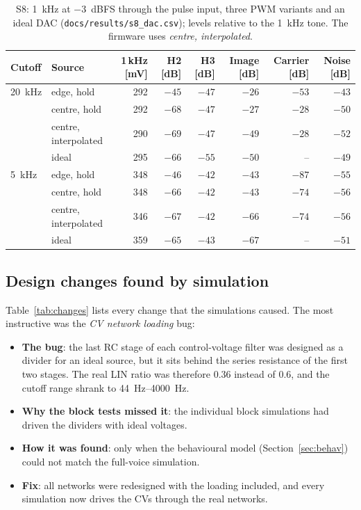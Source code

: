 \documentclass[11pt,a4paper]{article}
\newcommand{\file}[1]{\texttt{#1}}
\begin{document}
\begin{table}[h]
\centering\small
\caption{S8: \SI{1}{kHz} at \SI{-3}{dBFS} through the pulse input, three PWM variants and an ideal DAC
(\file{docs/results/s8\_dac.csv}); levels relative to the \SI{1}{kHz} tone. The firmware uses
\emph{centre, interpolated}.}\label{tab:s8}
\setlength{\tabcolsep}{4.5pt}
\begin{tabular}{@{}l l r r r r r r@{}}
\toprule
Cutoff & Source & 1\,kHz [mV] & H2 [dB] & H3 [dB] & Image [dB] & Carrier [dB] & Noise [dB] \\
\midrule
\SI{20}{kHz} & edge, hold & 292 & $-45$ & $-47$ & $-26$ & $-53$ & $-43$ \\
 & centre, hold & 292 & $-68$ & $-47$ & $-27$ & $-28$ & $-50$ \\
 & centre, interpolated & 290 & $-69$ & $-47$ & $-49$ & $-28$ & $-52$ \\
 & ideal & 295 & $-66$ & $-55$ & $-50$ & -- & $-49$ \\
\midrule
\SI{5}{kHz} & edge, hold & 348 & $-46$ & $-42$ & $-43$ & $-87$ & $-55$ \\
 & centre, hold & 348 & $-66$ & $-42$ & $-43$ & $-74$ & $-56$ \\
 & centre, interpolated & 346 & $-67$ & $-42$ & $-66$ & $-74$ & $-56$ \\
 & ideal & 359 & $-65$ & $-43$ & $-67$ & -- & $-51$ \\
\bottomrule
\end{tabular}
\end{table}

\subsection{Design changes found by simulation}\label{sec:lesson}
Table~\ref{tab:changes} lists every change that the simulations caused. The most instructive was the
\emph{CV network loading} bug:
\begin{itemize}
  \item \textbf{The bug}: the last RC stage of each control-voltage filter was designed as a divider for an
    ideal source, but it sits behind the series resistance of the first two stages. The real LIN ratio was
    therefore 0.36 instead of 0.6, and the cutoff range shrank to \SIrange{44}{4000}{Hz}.
  \item \textbf{Why the block tests missed it}: the individual block simulations had driven the dividers
    with ideal voltages.
  \item \textbf{How it was found}: only when the behavioural model (Section~\ref{sec:behav}) could not
    match the full-voice simulation.
  \item \textbf{Fix}: all networks were redesigned with the loading included, and every simulation now
    drives the CVs through the real networks.
\end{itemize}
\end{document}
